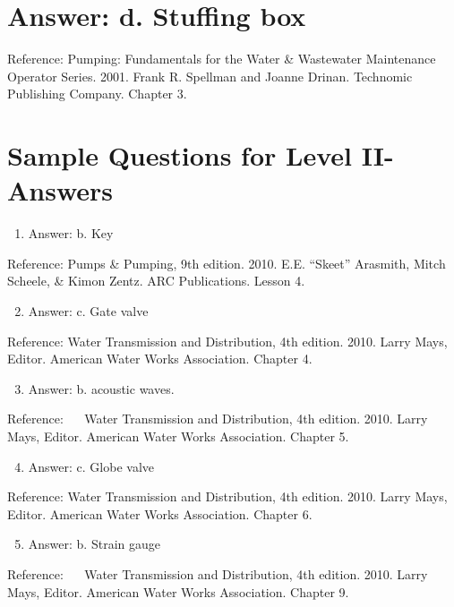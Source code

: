 \documentclass[10pt]{article}
\begin{document}
\section{Answer: d. Stuffing box}
Reference: Pumping: Fundamentals for the Water \& Wastewater Maintenance Operator Series. 2001. Frank R. Spellman and Joanne Drinan. Technomic Publishing Company. Chapter 3.

\section{Sample Questions for Level II-Answers}
\begin{enumerate}
  \item Answer: b. Key
\end{enumerate}

Reference: Pumps \& Pumping, 9th edition. 2010. E.E. “Skeet” Arasmith, Mitch Scheele, \& Kimon Zentz. ARC Publications. Lesson 4.

\begin{enumerate}
  \setcounter{enumi}{1}
  \item Answer: c. Gate valve
\end{enumerate}

Reference: Water Transmission and Distribution, 4th edition. 2010. Larry Mays, Editor. American Water Works Association. Chapter 4.

\begin{enumerate}
  \setcounter{enumi}{2}
  \item Answer: b. acoustic waves.
\end{enumerate}

Reference: $\quad$ Water Transmission and Distribution, 4th edition. 2010. Larry Mays, Editor. American Water Works Association. Chapter 5.

\begin{enumerate}
  \setcounter{enumi}{3}
  \item Answer: c. Globe valve
\end{enumerate}

Reference: Water Transmission and Distribution, 4th edition. 2010. Larry Mays, Editor. American Water Works Association. Chapter 6.

\begin{enumerate}
  \setcounter{enumi}{4}
  \item Answer: b. Strain gauge
\end{enumerate}

Reference: $\quad$ Water Transmission and Distribution, 4th edition. 2010. Larry Mays, Editor. American Water Works Association. Chapter 9.
\end{document}
